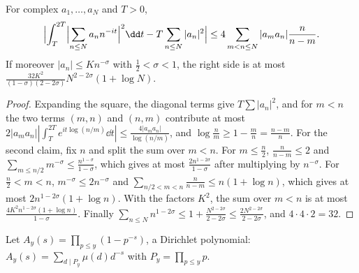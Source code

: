 \begin{lemma}\label{lem:crudemvt}
For complex $a_1,\dots,a_N$ and $T>0$,
\[
\Bigl|\int_T^{2T}\Bigl|\sum_{n\le N}a_nn^{-it}\Bigr|^2\dd t-T\sum_{n\le N}|a_n|^2\Bigr|\le4\sum_{m<n\le N}|a_ma_n|\frac n{n-m}.
\]
If moreover $|a_n|\le Kn^{-\sigma}$ with $\frac12<\sigma<1$, the right side is at most $\frac{32K^2}{(1-\sigma)(2-2\sigma)}N^{2-2\sigma}(1+\log N)$.
\end{lemma}
\begin{proof}
Expanding the square, the diagonal terms give $T\sum|a_n|^2$, and for $m<n$ the two terms $(m,n)$ and $(n,m)$ contribute at most $2|a_ma_n||\int_T^{2T}e^{it\log(n/m)}\dd t|\le\frac{4|a_ma_n|}{\log(n/m)}$, and $\log\frac nm\ge1-\frac mn=\frac{n-m}n$. For the second claim, fix $n$ and split the sum over $m<n$. For $m\le\frac n2$, $\frac n{n-m}\le2$ and $\sum_{m\le n/2}m^{-\sigma}\le\frac{n^{1-\sigma}}{1-\sigma}$, which gives at most $\frac{2n^{1-2\sigma}}{1-\sigma}$ after multiplying by $n^{-\sigma}$. For $\frac n2<m<n$, $m^{-\sigma}\le2n^{-\sigma}$ and $\sum_{n/2<m<n}\frac n{n-m}\le n(1+\log n)$, which gives at most $2n^{1-2\sigma}(1+\log n)$. With the factors $K^2$, the sum over $m<n$ is at most $\frac{4K^2n^{1-2\sigma}(1+\log n)}{1-\sigma}$. Finally $\sum_{n\le N}n^{1-2\sigma}\le1+\frac{N^{2-2\sigma}}{2-2\sigma}\le\frac{2N^{2-2\sigma}}{2-2\sigma}$, and $4\cdot4\cdot2=32$.
\end{proof}

Let $A_y(s)=\prod_{p\le y}(1-p^{-s})$, a Dirichlet polynomial: $A_y(s)=\sum_{d\mid P_y}\mu(d)d^{-s}$ with $P_y=\prod_{p\le y}p$.

